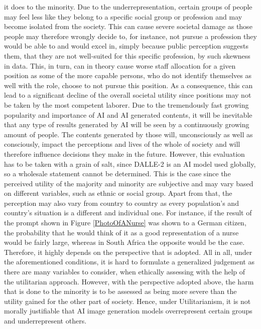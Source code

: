 \documentclass[10pt,twocolumn,twoside]{osajnl}
\begin{document}
it does to the minority. Due to the underrepresentation, certain groups of people may feel less like they belong to a specific social group or profession and may become isolated from the society. This can cause
severe societal damage as those people may therefore wrongly decide to, for instance, not pursue a profession they would be able to and would excel in, simply because public perception suggests them,
that they are not well-suited for this specific profession, by such skewness in data. This, in turn, can in theory cause worse staff allocation for a given position as some of the more capable persons,
who do not identify themselves as well with the role, choose to not pursue this position. As a consequence, this can lead to a significant decline of the overall societal utility since positions 
may not be taken by the most competent laborer. Due to the tremendously fast growing popularity and importance of AI and AI generated contents, it will be inevitable that any type of results generated 
by AI will be seen by a continuously growing amount of people. The contents generated by those will, unconsciously as well as consciously, impact the perceptions and lives of the whole of society and will therefore
influence decisions they make in the future.  
However, this evaluation has to be taken with a grain of salt, since DALLE-2 is an AI model used globally, so a wholesale statement cannot be determined. This is the case 
since the perceived utility of the majority and minority are subjective and may vary based on different variables, such as ethnic or social group. Apart from that,
the perception may also vary from country to country as every population's and country's situation is a different and individual one. 
For instance, if the result of the prompt shown in Figure \ref{PhotoOfANurse} was shown to a German citizen, the probability that he would think of it as a good representation of a nurse would be 
fairly large, whereas in South Africa the opposite would be the case. Therefore, it highly depends on the perspective that is adopted.
All in all, under the aforementioned conditions, it is hard to formulate a generalized judgement as there are many variables to consider, when ethically assessing with the help of the utilitarian approach.
However, with the perspective adopted above, the harm that is done to the minority is to be assessed as being more severe than the utility gained for the other part of society. Hence, under Utilitarianism,
it is not morally justifiable that AI image generation models overrepresent certain groups and underrepresent others.  
\end{document}
